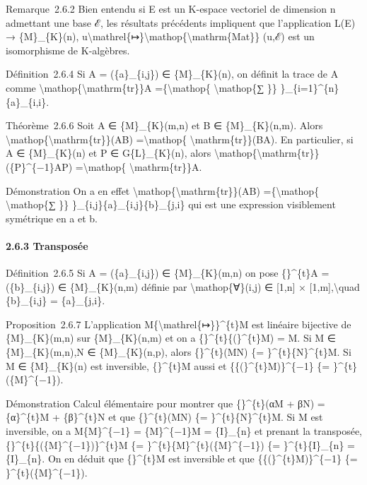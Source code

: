 \documentclass[]{article}
\begin{document}
Remarque~2.6.2 Bien entendu si E est un K-espace vectoriel de dimension
n admettant une base ℰ, les résultats précédents impliquent que
l'application L(E) → \{M\}\_\{K\}(n),
u\textbackslash{}mathrel\{↦\}\textbackslash{}mathop\{\textbackslash{}mathrm\{Mat\}\}
(u,ℰ) est un isomorphisme de K-algèbres.

Définition~2.6.4 Si A = (\{a\}\_\{i,j\}) ∈ \{M\}\_\{K\}(n), on définit
la trace de A comme
\textbackslash{}mathop\{\textbackslash{}mathrm\{tr\}\}A
=\{\textbackslash{}mathop\{ \textbackslash{}mathop\{∑ \}\}
\}\_\{i=1\}\^{}\{n\}\{a\}\_\{i,i\}.

Théorème~2.6.6 Soit A ∈ \{M\}\_\{K\}(m,n) et B ∈ \{M\}\_\{K\}(n,m).
Alors \textbackslash{}mathop\{\textbackslash{}mathrm\{tr\}\}(AB)
=\textbackslash{}mathop\{ \textbackslash{}mathrm\{tr\}\}(BA). En
particulier, si A ∈ \{M\}\_\{K\}(n) et P ∈ G\{L\}\_\{K\}(n), alors
\textbackslash{}mathop\{\textbackslash{}mathrm\{tr\}\}(\{P\}\^{}\{−1\}AP)
=\textbackslash{}mathop\{ \textbackslash{}mathrm\{tr\}\}A.

Démonstration On a en effet
\textbackslash{}mathop\{\textbackslash{}mathrm\{tr\}\}(AB)
=\{\textbackslash{}mathop\{ \textbackslash{}mathop\{∑ \}\}
\}\_\{i,j\}\{a\}\_\{i,j\}\{b\}\_\{j,i\} qui est une expression
visiblement symétrique en a et b.

\paragraph{2.6.3 Transposée}

Définition~2.6.5 Si A = (\{a\}\_\{i,j\}) ∈ \{M\}\_\{K\}(m,n) on pose
\{\}\^{}\{t\}A = (\{b\}\_\{i,j\}) ∈ \{M\}\_\{K\}(n,m) définie par
\textbackslash{}mathop\{∀\}(i,j) ∈ {[}1,n{]} ×
{[}1,m{]},\textbackslash{}quad \{b\}\_\{i,j\} = \{a\}\_\{j,i\}.

Proposition~2.6.7 L'application
M\{\textbackslash{}mathrel\{↦\}\}\^{}\{t\}M est linéaire bijective de
\{M\}\_\{K\}(m,n) sur \{M\}\_\{K\}(n,m) et on a
\{\}\^{}\{t\}\{(\}\^{}\{t\}M) = M. Si M ∈ \{M\}\_\{K\}(m,n),N ∈
\{M\}\_\{K\}(n,p), alors \{\}\^{}\{t\}(MN) \{=
\}\^{}\{t\}\{N\}\^{}\{t\}M. Si M ∈ \{M\}\_\{K\}(n) est inversible,
\{\}\^{}\{t\}M aussi et \{\{(\}\^{}\{t\}M)\}\^{}\{−1\} \{=
\}\^{}\{t\}(\{M\}\^{}\{−1\}).

Démonstration Calcul élémentaire pour montrer que \{\}\^{}\{t\}(αM + βN)
= \{α\}\^{}\{t\}M + \{β\}\^{}\{t\}N et que \{\}\^{}\{t\}(MN) \{=
\}\^{}\{t\}\{N\}\^{}\{t\}M. Si M est inversible, on a M\{M\}\^{}\{−1\} =
\{M\}\^{}\{−1\}M = \{I\}\_\{n\} et prenant la transposée,
\{\}\^{}\{t\}\{(\{M\}\^{}\{−1\})\}\^{}\{t\}M \{=
\}\^{}\{t\}\{M\}\^{}\{t\}(\{M\}\^{}\{−1\}) \{= \}\^{}\{t\}\{I\}\_\{n\} =
\{I\}\_\{n\}. On en déduit que \{\}\^{}\{t\}M est inversible et que
\{\{(\}\^{}\{t\}M)\}\^{}\{−1\} \{= \}\^{}\{t\}(\{M\}\^{}\{−1\}).
\end{document}

